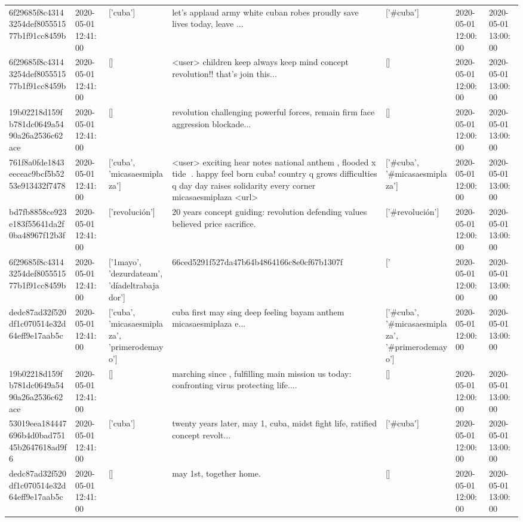\begin{tabular}{lllllll}
6f29685f8c43143254def805551577b1f91cc8459b & 2020-05-01 12:41:00 & ['cuba'] & let's applaud army white cuban robes proudly save lives today, leave ... & ['#cuba'] & 2020-05-01 12:00:00 & 2020-05-01 13:00:00 \\
6f29685f8c43143254def805551577b1f91cc8459b & 2020-05-01 12:41:00 & [] & <user> children keep always keep mind concept revolution!!️ that's join this... & [] & 2020-05-01 12:00:00 & 2020-05-01 13:00:00 \\
19b02218d159fb781dc0649a5490a26a2536c62ace & 2020-05-01 12:41:00 & [] & revolution challenging powerful forces, remain firm face aggression blockade... & [] & 2020-05-01 12:00:00 & 2020-05-01 13:00:00 \\
761f8a0fde1843eeceac9bcf5b5253e913432f7478 & 2020-05-01 12:41:00 & ['cuba', 'micasaesmiplaza'] & <user> exciting hear notes national anthem ️, flooded x tide 👏. happy feel born cuba! country q grows difficulties q day day raises solidarity every corner micasaesmiplaza <url> & ['#cuba', '#micasaesmiplaza'] & 2020-05-01 12:00:00 & 2020-05-01 13:00:00 \\
bd7fb8858ce923e183f55641da2f0ba48967f12b3f & 2020-05-01 12:41:00 & ['revolución'] & 20 years concept guiding: revolution defending values believed price sacrifice. & ['#revolución'] & 2020-05-01 12:00:00 & 2020-05-01 13:00:00 \\
6f29685f8c43143254def805551577b1f91cc8459b & 2020-05-01 12:41:00 & ['1mayo', 'dezurdateam', 'díadeltrabajador'] & 66ced5291f527da47b64b4864166c8e0cf67b1307f & ['#1mayo', '#dezurdateam', '#díadeltrabajador'] & 2020-05-01 12:00:00 & 2020-05-01 13:00:00 \\
dedc87ad32f520df1c070514e32d64eff9e17aab5c & 2020-05-01 12:41:00 & ['cuba', 'micasaesmiplaza', 'primerodemayo'] & cuba first may sing deep feeling bayam anthem micasaesmiplaza e... & ['#cuba', '#micasaesmiplaza', '#primerodemayo'] & 2020-05-01 12:00:00 & 2020-05-01 13:00:00 \\
19b02218d159fb781dc0649a5490a26a2536c62ace & 2020-05-01 12:41:00 & [] & marching since , fulfilling main mission us today: confronting virus protecting life.... & [] & 2020-05-01 12:00:00 & 2020-05-01 13:00:00 \\
53019eea184447696b4d0bad75145b2647618ad9f6 & 2020-05-01 12:41:00 & ['cuba'] & twenty years later, may 1, cuba, midst fight life, ratified concept revolt... & ['#cuba'] & 2020-05-01 12:00:00 & 2020-05-01 13:00:00 \\
dedc87ad32f520df1c070514e32d64eff9e17aab5c & 2020-05-01 12:41:00 & [] & may 1st, together home. & [] & 2020-05-01 12:00:00 & 2020-05-01 13:00:00 \\

\end{tabular}
